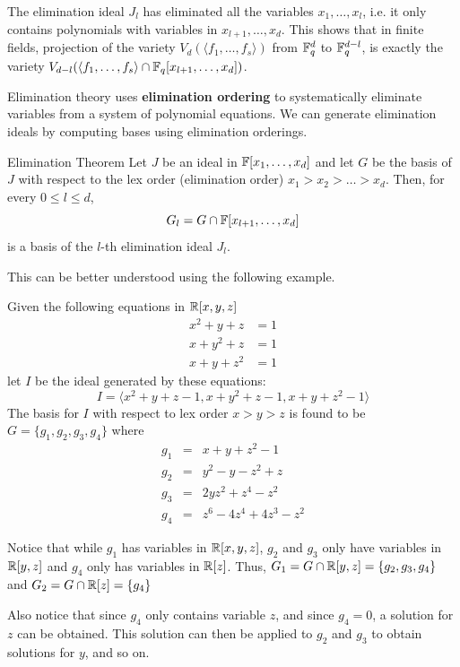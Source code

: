 The elimination ideal $J_l$ has eliminated all the variables 
$x_1,\dots,x_l$, i.e. it only contains polynomials with variables in
$x_{l+1},\dots,x_d$. 
This shows that in finite fields, projection of the variety $V_{d}(\langle f_1,\dots,f_s\rangle)$
from ${\mathbb{F}}_{q}^d$ to ${\mathbb{F}}_{q}^{d-l}$, is exactly the variety $V_{d-l}(\langle f_1,\dots,f_s\rangle\cap {\mathbb{F}}_{q}[x_{l+1},\dots,x_d])$.

Elimination theory uses {\bf elimination ordering} 
to systematically eliminate variables from a system of polynomial
equations.
We can generate elimination ideals by computing
\Grobner bases using elimination orderings. 

\begin{Theorem}{Elimination Theorem}
Let $J$ be an ideal in ${\mathbb{F}}[x_1,\dots,x_d]$ and let $G$ be the \Grobner 
basis of $J$ with respect to the lex order (elimination order) 
$x_1>x_2>\dots>x_d$. Then, for every $0\leq l\leq d$,
\begin{equation}
G_l=G\cap {\mathbb{F}}[x_{l+1},\dots,x_d]
\end{equation}
is a \Grobner basis of the $l$-th elimination ideal $J_l$.
\label{thm:elimth}
\end{Theorem}

This can be better understood using the following example.

\begin{Example}
Given the following equations in ${\mathbb{R}}[x,y,z]$
\begin{eqnarray}
x^2+y+z&=1 \nonumber \\
x+y^2+z&=1 \nonumber \\
x+y+z^2&=1 \nonumber
\end{eqnarray}
let $I$ be the ideal generated by these equations:
\begin{equation}
I=\langle x^2+y+z-1, x+y^2+z-1, x+y+z^2-1\rangle \nonumber
\end{equation}
The \Grobner basis for $I$ with respect to lex order $x>y>z$ is 
found to be $G=\{g_1,g_2,g_3,g_4\}$ where
\begin{eqnarray}
g_1&=&x+y+z^2-1 \nonumber \\
g_2&=&y^2-y-z^2+z \nonumber \\
g_3&=&2yz^2+z^4-z^2 \nonumber \\
g_4&=&z^6-4z^4+4z^3-z^2 \nonumber
\end{eqnarray}

Notice that while $g_1$ has variables in ${\mathbb{R}}[x,y,z]$, $g_2$ and $g_3$ only 
have variables in ${\mathbb{R}}[y,z]$ and $g_4$ only has variables in ${\mathbb{R}}[z]$. Thus, 
$G_1=G\cap {\mathbb{R}}[y,z]=\{g_2,g_3,g_4\}$ and $G_2=G\cap {\mathbb{R}}[z]=\{g_4\}$

Also notice that since $g_4$ only contains variable $z$, and since $g_4=0$, 
a solution for $z$ can be obtained. This solution can then be applied to 
$g_2$ and $g_3$ to obtain solutions for $y$, and so on.
\end{Example}

